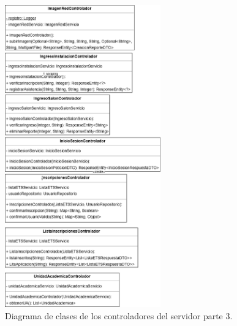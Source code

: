 \begin{figure}[htbp!]
	\begin{center}
		\includegraphics[width=0.6\textwidth]{Clases/Controlador3.png}
		\caption{Diagrama de clases de los controladores del servidor parte 3.}
		\label{fig:DC3}
	\end{center}
\end{figure}

